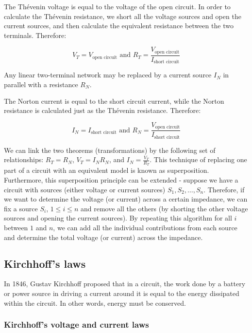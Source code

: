 \documentclass{article}
\begin{document}
The Thévenin voltage is equal to the voltage of the open circuit. In order to calculate the Thévenin resistance, we short all the voltage sources and open the current sources, and then calculate the equivalent resistance between the two terminals. Therefore:

\[ V_T = V_{\text{open circuit}} \text{   and   } R_T = \frac{V_{\text{open circuit}}}{I_{\text{short circuit}}} \]


\begin{theorem}
    Any linear two-terminal network may be replaced by a current source $I_N$ in parallel with a resistance $R_N$.
\end{theorem}

The Norton current is equal to the short circuit current, while the Norton resistance is calculated just as the Thévenin resistance. Therefore:

\[ I_N = I_{\text{short circuit}} \text{   and   } R_N = \frac{V_{\text{open circuit}}}{I_{\text{short circuit}}} \]

We can link the two theorems (transformations) by the following set of relationships: $R_T = R_N$, $V_T = I_NR_N$, and $I_N = \frac{V_T}{R_T}$. This technique of replacing one part of a circuit with an equivalent model is known as superposition. Furthermore, this superposition principle can be extended - suppose we have a circuit with sources (either voltage or current sources) $S_1, S_2, \dots, S_n$. Therefore, if we want to determine the voltage (or current) across a certain impedance, we can fix a source $S_i$, $1 \leq i \leq n$ and remove all the others (by shorting the other voltage sources and opening the current sources). By repeating this algorithm for all $i$ between $1$ and $n$, we can add all the individual contributions from each source and determine the total voltage (or current) across the impedance.

\newpage

\subsection{Kirchhoff's laws}

In 1846, Gustav Kirchhoff proposed that in a circuit, the work done by a battery or power source in driving a current around it is equal to the energy dissipated within the circuit. In other words, energy must be conserved.

\subsubsection{Kirchhoff's voltage and current laws}
\end{document}
